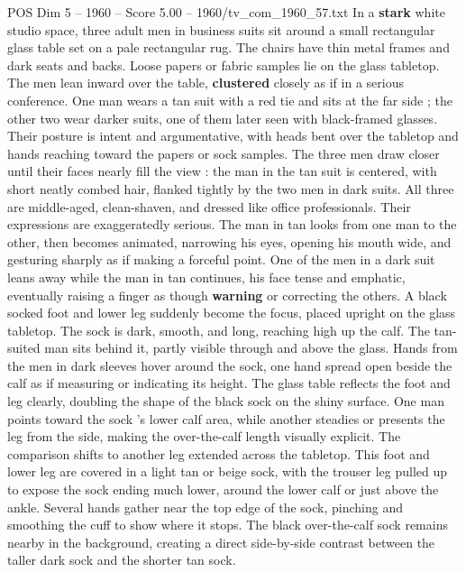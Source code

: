 \begin{textsample}{POS Dim 5 – 1960 – Score 5.00 – 1960/tv\_com\_1960\_57.txt}  \label{ex:f5_pos_057}
In a \textbf{stark} white studio space, three adult men in business suits sit around a small rectangular glass table set on a pale rectangular rug.
The chairs have thin metal frames and dark seats and backs.
Loose papers or fabric samples lie on the glass tabletop.
The men lean inward over the table, \textbf{clustered} closely as if in a serious conference.
One man wears a tan suit with a red tie and sits at the far side ; the other two wear darker suits, one of them later seen with black-framed glasses.
Their posture is intent and argumentative, with heads bent over the tabletop and hands reaching toward the papers or sock samples.
The three men draw closer until their faces nearly fill the view : the man in the tan suit is centered, with short neatly combed hair, flanked tightly by the two men in dark suits.
All three are middle-aged, clean-shaven, and dressed like office professionals.
Their expressions are exaggeratedly serious.
The man in tan looks from one man to the other, then becomes animated, narrowing his eyes, opening his mouth wide, and gesturing sharply as if making a forceful point.
One of the men in a dark suit leans away while the man in tan continues, his face tense and emphatic, eventually raising a finger as though \textbf{warning} or correcting the others.
A black socked foot and lower leg suddenly become the focus, placed upright on the glass tabletop.
The sock is dark, smooth, and long, reaching high up the calf.
The tan-suited man sits behind it, partly visible through and above the glass.
Hands from the men in dark sleeves hover around the sock, one hand spread open beside the calf as if measuring or indicating its height.
The glass table reflects the foot and leg clearly, doubling the shape of the black sock on the shiny surface.
One man points toward the sock ’s lower calf area, while another steadies or presents the leg from the side, making the over-the-calf length visually explicit.
The comparison shifts to another leg extended across the tabletop.
This foot and lower leg are covered in a light tan or beige sock, with the trouser leg pulled up to expose the sock ending much lower, around the lower calf or just above the ankle.
Several hands gather near the top edge of the sock, pinching and smoothing the cuff to show where it stops.
The black over-the-calf sock remains nearby in the background, creating a direct side-by-side contrast between the taller dark sock and the shorter tan sock.

\end{textsample}
